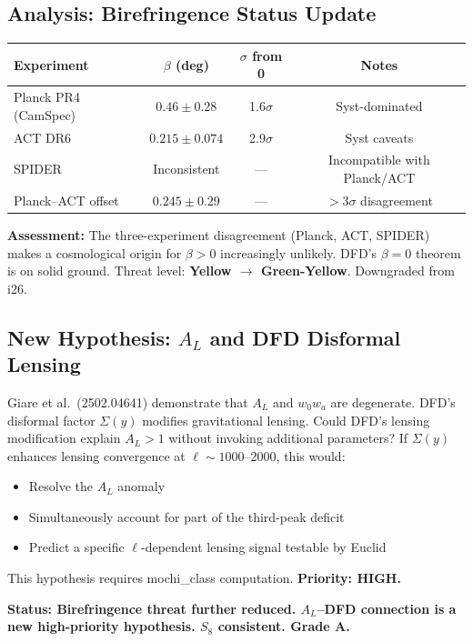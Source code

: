 \documentclass[11pt,a4paper]{article}
\begin{document}
\subsection{Analysis: Birefringence Status Update}

\begin{center}
\begin{tabular}{lccc}
\toprule
\textbf{Experiment} & $\beta$ (deg) & $\sigma$ from 0 & \textbf{Notes} \\
\midrule
Planck PR4 (CamSpec) & $0.46 \pm 0.28$ & 1.6$\sigma$ & Syst-dominated \\
ACT DR6 & $0.215 \pm 0.074$ & 2.9$\sigma$ & Syst caveats \\
SPIDER & Inconsistent & --- & Incompatible with Planck/ACT \\
Planck--ACT offset & $0.245 \pm 0.29$ & --- & $>3\sigma$ disagreement \\
\bottomrule
\end{tabular}
\end{center}

\textbf{Assessment:} The three-experiment disagreement (Planck, ACT, SPIDER) makes a cosmological origin for $\beta > 0$ increasingly unlikely. DFD's $\beta = 0$ theorem is on solid ground. Threat level: \textbf{Yellow $\to$ Green-Yellow}. Downgraded from i26.

\subsection{New Hypothesis: $A_L$ and DFD Disformal Lensing}

Giare et al.\ (2502.04641) demonstrate that $A_L$ and $w_0w_a$ are degenerate. DFD's disformal factor $\Sigma(y)$ modifies gravitational lensing. Could DFD's lensing modification explain $A_L > 1$ without invoking additional parameters? If $\Sigma(y)$ enhances lensing convergence at $\ell \sim 1000$--2000, this would:
\begin{itemize}
\item Resolve the $A_L$ anomaly
\item Simultaneously account for part of the third-peak deficit
\item Predict a specific $\ell$-dependent lensing signal testable by Euclid
\end{itemize}
This hypothesis requires mochi\_class computation. \textbf{Priority: HIGH.}

\textbf{Status: Birefringence threat further reduced. $A_L$--DFD connection is a new high-priority hypothesis. $S_8$ consistent. Grade A.}
\end{document}
